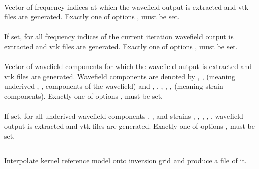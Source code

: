 \paragraph{}
Vector of  frequency indices at which the wavefield output is extracted and 
vtk files are generated. Exactly one of options  ,  must be set.
\paragraph{}
If set, for all frequency indices of the current iteration wavefield output is extracted and 
vtk files are generated. Exactly one of options  ,  must be set.
\paragraph{}
Vector of  wavefield components for which the wavefield output is extracted and 
vtk files are generated. 
Wavefield components are denoted by , ,  (meaning underived , , 
 components of the wavefield) and , , , , ,  
(meaning strain components). 
Exactly one of options ,  must be set.
\paragraph{}
If set, for all underived wavefield components , ,  and
strains , , , , ,  wavefield output is extracted and 
vtk files are generated. 
Exactly one of options ,  must be set.
%
%
\subsection{} \label{programs_scripts,sec:bin_prog,sec:krm_kim}
Interpolate kernel reference model onto inversion grid and produce a  file of it.

